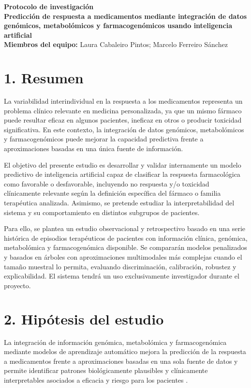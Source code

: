 \documentclass[11pt,a4paper]{article}
\begin{document}
\begin{center}
{\Large \textbf{Protocolo de investigación}}\\[0.3em]
{\large \textbf{Predicción de respuesta a medicamentos mediante integración de
datos genómicos, metabolómicos y farmacogenómicos usando inteligencia
artificial}}\\[0.8em]
\textbf{Miembros del equipo:} Laura Cabaleiro Pintos; Marcelo Ferreiro Sánchez
\end{center}

\section*{1. Resumen}
La variabilidad interindividual en la respuesta a los medicamentos representa un
problema clínico relevante en medicina personalizada, ya que un mismo fármaco
puede resultar eficaz en algunos pacientes, ineficaz en otros o producir
toxicidad significativa. En este contexto, la integración de datos genómicos,
metabolómicos y farmacogenómicos puede mejorar la capacidad predictiva frente a
aproximaciones basadas en una única fuente de información.

El objetivo del presente estudio es desarrollar y validar internamente un modelo
predictivo de inteligencia artificial capaz de clasificar la respuesta
farmacológica como favorable o desfavorable, incluyendo no respuesta y/o
toxicidad clínicamente relevante según la definición específica del fármaco o
familia terapéutica analizada. Asimismo, se pretende estudiar la
interpretabilidad del sistema y su comportamiento en distintos subgrupos de
pacientes.

Para ello, se plantea un estudio observacional y retrospectivo basado en una
serie histórica de episodios terapéuticos de pacientes con información clínica,
genómica, metabolómica y farmacogenómica disponible. Se compararán modelos
penalizados y basados en árboles con aproximaciones multimodales más complejas
cuando el tamaño muestral lo permita, evaluando discriminación, calibración,
robustez y explicabilidad. El sistema tendrá un uso exclusivamente investigador
durante el proyecto.

\section*{2. Hipótesis del estudio}
La integración de información genómica, metabolómica y farmacogenómica mediante
modelos de aprendizaje automático mejora la predicción de la respuesta a
medicamentos frente a aproximaciones basadas en una sola fuente de datos y
permite identificar patrones biológicamente plausibles y clínicamente
interpretables asociados a eficacia y riesgo para los pacientes
\cite{roden2019,hasin2017,reel2021}.
\end{document}
